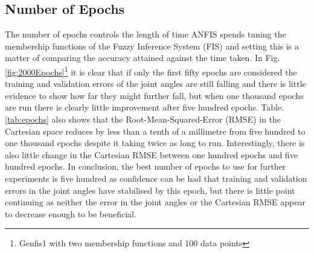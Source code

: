 \documentclass[11.5pt, twoside, a4paper]{article}
\begin{document}
\begin{table}
\begin{center}
\caption{Results from changing range of $\theta_3$. \label{tab:range}}\end{center}
\end{table}


\subsection{Number of Epochs}
The number of epochs controls the length of time ANFIS spends tuning the membership functions of the Fuzzy Inference System (FIS) and setting this is a matter of comparing the accuracy attained against the time taken. In Fig.\ref{fig:2000Epochs}\footnote{Genfis1 with two membership functions and 100 data points} it is clear that if only the first fifty epochs are considered the training and validation errors of the joint angles are still falling and there is little evidence to show how far they might further fall, but when one thousand epochs are run there is clearly little improvement after five hundred epochs. Table.\ref{tab:epochs} also shows that the Root-Mean-Squared-Error (RMSE) in the Cartesian space reduces by less than a tenth of a millimetre from five hundred to one thousand epochs despite it taking twice as long to run. Interestingly, there is also little change in the Cartesian RMSE between one hundred epochs and five hundred epochs. In conclusion, the best number of epochs to use for further experiments is five hundred as confidence can be had that training and validation errors in the joint angles have stabilised by this epoch, but there is little point continuing as neither the error in the joint angles or the Cartesian RMSE appear to decrease enough to be beneficial.
\end{document}
